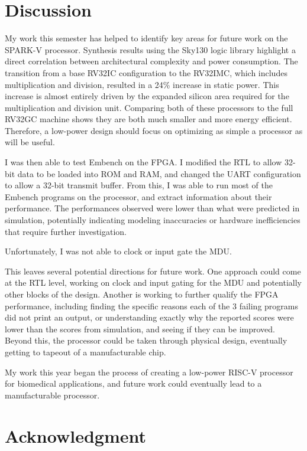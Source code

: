 \documentclass[conference]{IEEEtran}
\begin{document}
\section{Discussion}
My work this semester has helped to identify key areas for future work on the SPARK-V processor. Synthesis results using the Sky130 logic library highlight a direct correlation between architectural complexity and power consumption. The transition from a base RV32IC configuration to the RV32IMC, which includes multiplication and division, resulted in a 24\% increase in static power. This increase is almost entirely driven by the expanded silicon area required for the multiplication and division unit. Comparing both of these processors to the full RV32GC machine shows they are both much smaller and more energy efficient. Therefore, a low-power design should focus on optimizing as simple a processor as will be useful. 

I was then able to test Embench on the FPGA. I modified the RTL to allow 32-bit data to be loaded into ROM and RAM, and changed the UART configuration to allow a 32-bit transmit buffer. From this, I was able to run most of the Embench programs on the processor, and extract information about their performance. The performances observed were lower than what were predicted in simulation, potentially indicating modeling inaccuracies or hardware inefficiencies that require further investigation.

Unfortunately, I was not able to clock or input gate the MDU.

This leaves several potential directions for future work. One approach could come at the RTL level, working on clock and input gating for the MDU and potentially other blocks of the design. Another is working to further qualify the FPGA performance, including finding the specific reasons each of the 3 failing programs did not print an output, or understanding exactly why the reported scores were lower than the scores from simulation, and seeing if they can be improved. Beyond this, the processor could be taken through physical design, eventually getting to tapeout of a manufacturable chip. 

My work this year began the process of creating a low-power RISC-V processor for biomedical applications, and future work could eventually lead to a manufacturable processor. 



\section*{Acknowledgment}
\end{document}
